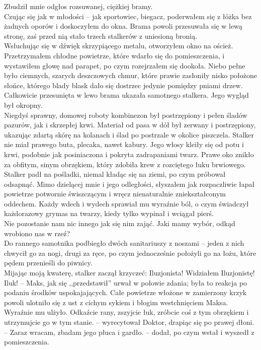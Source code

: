 \documentclass[../MAIN.tex]{subfiles}
\begin{document}
Zbudził mnie odgłos rozsuwanej, ciężkiej bramy.\\
Czując się jak w młodości -- jak sportowiec, biegacz, poderwałem się z łóżka bez żadnych oporów i doskoczyłem do okna. Brama powoli przesuwała się w lewą stronę, zaś przed nią stało trzech stalkerów z uniesioną bronią.\\
Wsłuchując się w dźwięk skrzypiącego metalu, otworzyłem okno na oścież. Przetrzymałem chłodne powietrze, które wdarło się do pomieszczenia, i wystawiłem głowę nad parapet, po czym rozejrzałem się dookoła. Niebo pełne było ciemnych, szarych deszczowych chmur, które prawie zasłoniły nisko położone słońce, którego blady blask dało się dostrzec jedynie pomiędzy pniami drzew.\\
Całkowicie przesunięta w lewo brama ukazała samotnego stalkera. Jego wygląd był okropny.\\
Niegdyś sprawny, domowej roboty kombinezon był postrzępiony i pełen śladów pazurów, jak i skrzepłej krwi. Materiał od pasa w dół był zerwany i postrzępiony, ukazując zdartą skórę na kolanach i ślad po postrzale w okolice piszczela. Stalker nie miał prawego buta, plecaka, nawet kabury. Jego włosy kleiły się od potu i krwi, podobnie jak posiniaczona i pokryta zadrapaniami twarz. Prawe oko znikło za obfitym, sinym obrzękiem, który zdobiła krew z rozciętego łuku brwiowego.\\
Stalker padł na pośladki, niemal kładąc się na ziemi, po czym próbował odsapnąć.
Mimo dzielącej mnie i jego odległości, słyszałem jak rozpaczliwie łapał powietrze potwornie świszczącym i wręcz nienaturalnie zniekształconym oddechem. Każdy wdech i wydech sprawiał mu wyraźnie ból, o czym świadczył każdorazowy grymas na twarzy, kiedy tylko wypinał i wciągał pierś.\\
Nie pozostanie nam nic innego jak się nim zająć. Jaki mamy wybór, odkąd wrobiono nas w rzeź?\\
Do rannego samotnika podbiegło dwóch sanitariuszy z noszami -- jeden z nich chwycił go za nogi, drugi za ręce, po czym jednocześnie położyli go na łożu, które pędem przenieśli do piwnicy.\\
Mijając moją kwaterę, stalker zaczął krzyczeć:
\sx Iluzjonista! Widziałem Iluzjonistę!
\qd
\dd
\sx Ilu\3k! -- Maks, jak się ,,przedstawił'' urwał w połowie zdania; była to reakcja po podaniu środków uspokajających.
\qd Całe powietrze włożone w zamierzony krzyk powoli ulotniło się z ust z cichym sykiem i błogim westchnięciem Maksa. Wyraźnie mu ulżyło.
\sx Odkaźcie rany, zszyjcie łuk, zróbcie coś z tym obrzękiem i utrzymujcie go w tym stanie. -- wyrecytował Doktor, drapiąc się po prawej dłoni. -- Zaraz wracam, zbadam jego płuca i gardło. -- dodał, po czym wstał i wyszedł z pomieszczenia.
\end{document}
